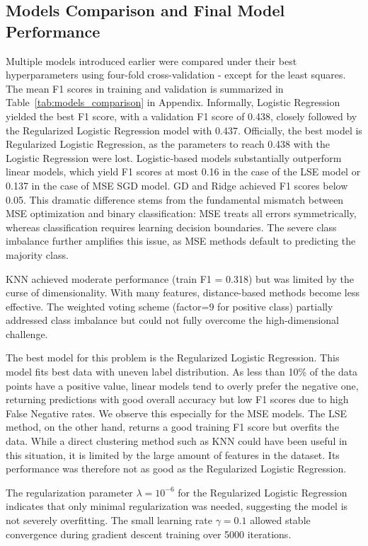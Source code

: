 \documentclass[10pt,conference,compsocconf]{IEEEtran}
\begin{document}
\subsection{Models Comparison and Final Model Performance}
Multiple models introduced earlier were compared under their best hyperparameters using four-fold cross-validation - except for the least squares. The mean F1 scores in training and validation is  summarized in Table~\ref{tab:models_comparison} in Appendix.  Informally, Logistic Regression yielded the best F1 score, with a validation F1 score of 0.438, closely followed by the Regularized Logistic Regression model with 0.437. Officially, the best model is Regularized Logistic Regression, as the parameters to reach 0.438 with the Logistic Regression were lost. Logistic-based models substantially outperform linear models, which yield F1 scores at most 0.16 in the case of the LSE model or 0.137 in the case of MSE SGD model. 
GD and Ridge achieved F1 scores below 0.05. This dramatic difference stems from the fundamental mismatch between MSE optimization and binary classification: MSE treats all errors symmetrically, whereas classification requires learning decision boundaries. The severe class imbalance further amplifies this issue, as MSE methods default to predicting the majority class.

KNN achieved moderate performance (train F1 = 0.318) but was limited by the curse of dimensionality. With many features, distance-based methods become less effective. The weighted voting scheme (factor=9 for positive class) partially addressed class imbalance but could not fully overcome the high-dimensional challenge.

The best model for this problem is the Regularized Logistic Regression. This model fits best data with uneven label distribution. As less than 10\% of the data points have a positive value, linear models tend to overly prefer the negative one, returning predictions with good overall accuracy but low F1 scores due to high False Negative rates. We observe this especially for the MSE models. The LSE method, on the other hand, returns a good training F1 score but overfits the data. While a direct clustering method such as KNN could have been useful in this situation, it is limited by the large amount of features in the dataset. Its performance was therefore not as good as the Regularized Logistic Regression.

The regularization parameter $\lambda=10^{-6}$ for the Regularized Logistic Regression indicates that only minimal regularization was needed, suggesting the model is not severely overfitting. The small learning rate $\gamma=0.1$ allowed stable convergence during gradient descent training over 5000 iterations.
\end{document}
